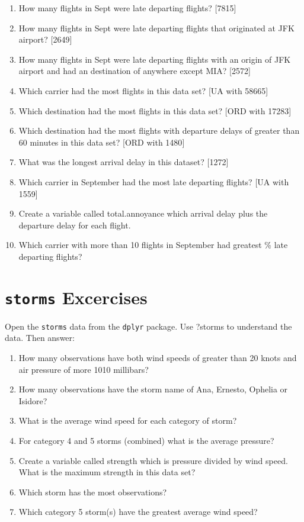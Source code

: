 \documentclass[
]{book}
\providecommand{\tightlist}{%
  \setlength{\itemsep}{0pt}\setlength{\parskip}{0pt}}
\begin{document}
\begin{enumerate}
\def\labelenumi{\arabic{enumi}.}
\tightlist
\item
  How many flights in Sept were late departing flights? {[}7815{]}
\item
  How many flights in Sept were late departing flights that originated at JFK airport? {[}2649{]}
\item
  How many flights in Sept were late departing flights with an origin of JFK airport and had an destination of anywhere except MIA? {[}2572{]}
\item
  Which carrier had the most flights in this data set? {[}UA with 58665{]}
\item
  Which destination had the most flights in this data set? {[}ORD with 17283{]}
\item
  Which destination had the most flights with departure delays of greater than 60 minutes in this data set? {[}ORD with 1480{]}
\item
  What was the longest arrival delay in this dataset? {[}1272{]}
\item
  Which carrier in September had the most late departing flights? {[}UA with 1559{]}
\item
  Create a variable called total.annoyance which arrival delay plus the departure delay for each flight.
\item
  Which carrier with more than 10 flights in September had greatest \% late departing flights?
\end{enumerate}

\hypertarget{storms-excercises}{%
\section{\texorpdfstring{\texttt{storms} Excercises}{storms Excercises}}\label{storms-excercises}}

Open the \texttt{storms} data from the \texttt{dplyr} package. Use ?storms to understand the data. Then answer:

\begin{enumerate}
\def\labelenumi{\arabic{enumi}.}
\tightlist
\item
  How many observations have both wind speeds of greater than 20 knots and air pressure of more 1010 millibars?
\item
  How many observations have the storm name of Ana, Ernesto, Ophelia or Isidore?
\item
  What is the average wind speed for each category of storm?
\item
  For category 4 and 5 storms (combined) what is the average pressure?
\item
  Create a variable called strength which is pressure divided by wind speed. What is the maximum strength in this data set?
\item
  Which storm has the most observations?
\item
  Which category 5 storm(s) have the greatest average wind speed?
\end{enumerate}
\end{document}
